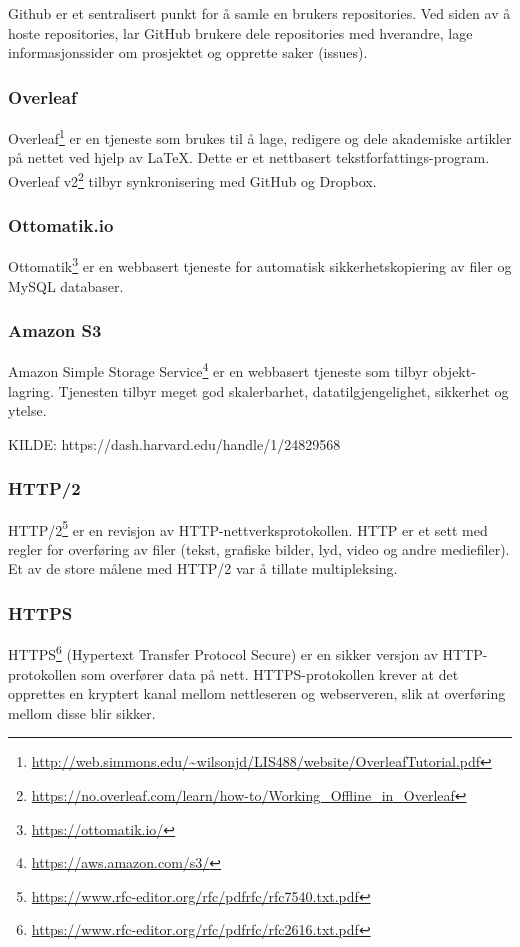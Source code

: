 Github er et sentralisert punkt for å samle en brukers repositories. Ved siden av å hoste repositories, lar GitHub brukere dele repositories med hverandre, lage informasjonssider om prosjektet og opprette saker (issues).
 
\subsubsection{Overleaf}
Overleaf\footnote{\url{http://web.simmons.edu/~wilsonjd/LIS488/website/OverleafTutorial.pdf}} er en tjeneste som brukes til å lage, redigere og dele akademiske artikler på nettet ved hjelp av LaTeX. Dette er et nettbasert tekstforfattings-program. 
Overleaf v2\footnote{\url{https://no.overleaf.com/learn/how-to/Working_Offline_in_Overleaf}} tilbyr synkronisering med GitHub og Dropbox.

\subsubsection{Ottomatik.io}
Ottomatik\footnote{\url{https://ottomatik.io/}} er en webbasert tjeneste for automatisk sikkerhetskopiering av filer og MySQL databaser.

\subsubsection{Amazon S3}
Amazon Simple Storage Service\footnote{\url{https://aws.amazon.com/s3/}} er en webbasert tjeneste som tilbyr objekt-lagring. Tjenesten tilbyr meget god skalerbarhet, datatilgjengelighet, sikkerhet og ytelse.

KILDE: https://dash.harvard.edu/handle/1/24829568

\subsubsection{HTTP/2}
HTTP/2\footnote{\url{https://www.rfc-editor.org/rfc/pdfrfc/rfc7540.txt.pdf}} er en revisjon av HTTP-nettverksprotokollen. HTTP er et sett med regler for overføring av filer (tekst, grafiske bilder, lyd, video og andre mediefiler). Et av de store målene med HTTP/2 var å tillate multipleksing.

\subsubsection{HTTPS}
HTTPS\footnote{\url{https://www.rfc-editor.org/rfc/pdfrfc/rfc2616.txt.pdf}} (Hypertext Transfer Protocol Secure) er en sikker versjon av HTTP-protokollen som overfører data på nett. HTTPS-protokollen krever at det opprettes en kryptert kanal mellom nettleseren og webserveren, slik at overføring mellom disse blir sikker.

